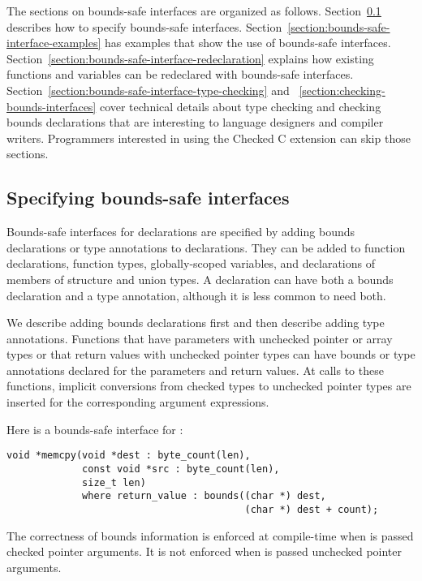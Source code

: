 The sections on bounds-safe interfaces are organized as
follows.  Section~\ref{section:bounds-safe-interface-specifying} describes
how to specify bounds-safe interfaces.
Section~\ref{section:bounds-safe-interface-examples}
has examples that show the use of bounds-safe interfaces.
Section~\ref{section:bounds-safe-interface-redeclaration} explains
how existing functions and variables can be redeclared with bounds-safe
interfaces.  Section~\ref{section:bounds-safe-interface-type-checking}
and ~\ref{section:checking-bounds-interfaces} cover technical details
about type checking and checking bounds declarations that are interesting
to language designers and compiler writers.  Programmers interested
in using the Checked C extension can skip those sections.

\subsection{Specifying bounds-safe interfaces}
\label{section:bounds-safe-interface-specifying}
Bounds-safe interfaces for declarations are specified by adding bounds
declarations or type annotations to declarations.  They can be added to
function declarations, function types, globally-scoped variables, and
declarations of members of structure and union types.
A declaration can have both a bounds declaration and a type annotation,
although it is less common to need both.

We describe adding bounds declarations first and then  describe adding type
annotations.  Functions that have parameters with unchecked pointer
or array types or that return values with unchecked pointer types can have bounds
or type annotations declared for the parameters and return values.  At calls to
these functions, implicit conversions from checked types to unchecked
pointer types are inserted for the corresponding argument expressions.
  
Here is a bounds-safe interface for :
\begin{lstlisting}
void *memcpy(void *dest : byte_count(len),
             const void *src : byte_count(len), 
             size_t len) 
             where return_value : bounds((char *) dest,
                                         (char *) dest + count);
\end{lstlisting}
The correctness of bounds information is enforced at compile-time when
 is passed checked pointer arguments. It is not enforced when 
 is passed unchecked pointer arguments.

